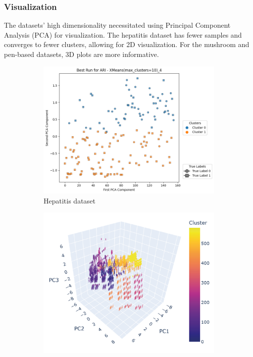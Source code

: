 \subsubsection{Visualization}

The datasets' high dimensionality necessitated using Principal Component Analysis (PCA) for visualization. The hepatitis dataset has fewer samples and converges to fewer clusters, allowing for 2D visualization. For the mushroom and pen-based datasets, 3D plots are more informative.

\begin{figure}[H]
	\centering
	\begin{subfigure}[b]{0.32\textwidth}
		\centering
		\includegraphics[width=\linewidth]{figures/XMeans/hepatitis_visualization.png}
		\caption{Hepatitis dataset}
		\label{fig:hepatitis_visualization}
	\end{subfigure}
	\begin{subfigure}[b]{0.32\textwidth}
		\centering
		\includegraphics[width=\linewidth]{figures/XMeans/mushroom_visualization.png}

\end{subfigure}
\end{figure}
